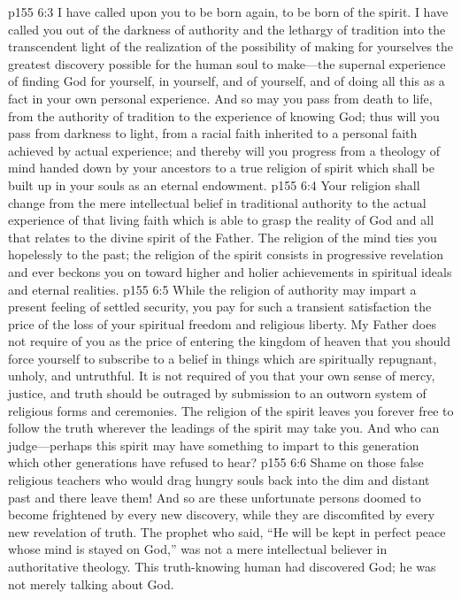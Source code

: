 \pc \vs p155 6:3 \textcolor{ubdarkred}{I have called upon you to be born again, to be born of the spirit. I have called you out of the darkness of authority and the lethargy of tradition into the transcendent light of the realization of the possibility of making for yourselves the greatest discovery possible for the human soul to make---the supernal experience of finding God for yourself, in yourself, and of yourself, and of doing all this as a fact in your own personal experience. And so may you pass from death to life, from the authority of tradition to the experience of knowing God; thus will you pass from darkness to light, from a racial faith inherited to a personal faith achieved by actual experience; and thereby will you progress from a theology of mind handed down by your ancestors to a true religion of spirit which shall be built up in your souls as an eternal endowment.}
\vs p155 6:4 \textcolor{ubdarkred}{Your religion shall change from the mere intellectual belief in traditional authority to the actual experience of that living faith which is able to grasp the reality of God and all that relates to the divine spirit of the Father. The religion of the mind ties you hopelessly to the past; the religion of the spirit consists in progressive revelation and ever beckons you on toward higher and holier achievements in spiritual ideals and eternal realities.}
\vs p155 6:5 \textcolor{ubdarkred}{While the religion of authority may impart a present feeling of settled security, you pay for such a transient satisfaction the price of the loss of your spiritual freedom and religious liberty. My Father does not require of you as the price of entering the kingdom of heaven that you should force yourself to subscribe to a belief in things which are spiritually repugnant, unholy, and untruthful. It is not required of you that your own sense of mercy, justice, and truth should be outraged by submission to an outworn system of religious forms and ceremonies. The religion of the spirit leaves you forever free to follow the truth wherever the leadings of the spirit may take you. And who can judge---perhaps this spirit may have something to impart to this generation which other generations have refused to hear?}
\vs p155 6:6 \textcolor{ubdarkred}{Shame on those false religious teachers who would drag hungry souls back into the dim and distant past and there leave them! And so are these unfortunate persons doomed to become frightened by every new discovery, while they are discomfited by every new revelation of truth. The prophet who said, “He will be kept in perfect peace whose mind is stayed on God,” was not a mere intellectual believer in authoritative theology. This truth\hyp{}knowing human had discovered God; he was not merely talking about God.}
